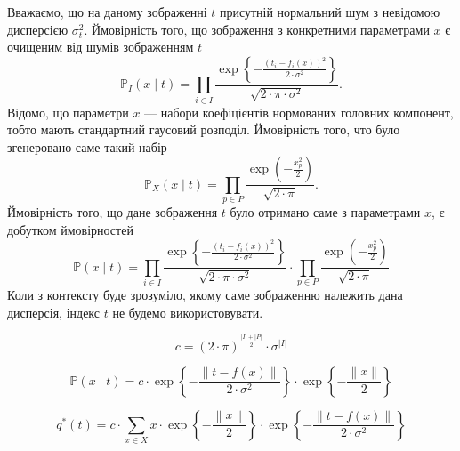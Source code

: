 Вважаємо, що на даному зображенні $t$
присутній нормальний шум з невідомою дисперсією $\sigma^2_t$.
Ймовірність того, що зображення з конкретними параметрами $x$
є очищеним від шумів зображенням $t$
\begin{equation*}
  \mathbb{P}_I\left( x \mid t \right)
  = \prod_{i \in I}
    \frac{\exp{\left\{ - \frac{\left( t_i - f_i\left( x \right) \right)^2}
    {2 \cdot \sigma^2} \right\}}}{\sqrt{2 \cdot \pi \cdot \sigma^2}}.
\end{equation*}
Відомо, що параметри $x$ --- набори коефіцієнтів нормованих головних компонент,
тобто мають стандартний гаусовий розподіл.
Ймовірність того, что було згенеровано саме такий набір
\begin{equation*}
  \mathbb{P}_X\left( x \mid t \right)
  = \prod_{p \in P}
    \frac{\exp{\left( - \frac{x_p^2}{2} \right)}}{\sqrt{2 \cdot \pi}}.
\end{equation*}
Ймовірність того,
що дане зображення $t$ було отримано саме з параметрами $x$,
є добутком ймовірностей
\begin{equation*}
  \mathbb{P}\left( x \mid t \right)
  = \prod_{i \in I}
    \frac{\exp{\left\{ - \frac{\left( t_i - f_i\left( x \right) \right)^2}
         {2 \cdot \sigma^2} \right\}}}{\sqrt{2 \cdot \pi \cdot \sigma^2}}
    \cdot
    \prod_{p \in P}
    \frac{\exp{\left( - \frac{x_p^2}{2} \right)}}{\sqrt{2 \cdot \pi}}
\end{equation*}
Коли з контексту буде зрозуміло,
якому саме зображенню належить дана дисперсія,
індекс $t$ не будемо використовувати.

\begin{equation*}
  c = \left( 2 \cdot \pi \right)^{\frac{\left| I \right| + \left| P \right|}{2}}
      \cdot \sigma^{\left| I \right|}
\end{equation*}

\begin{equation*}
  \mathbb{P}\left( x \mid t \right)
  = c
    \cdot \exp{\left\{ - \frac{\left\| t - f\left( x \right) \right\|}
                              {2 \cdot \sigma^2} \right\}}
    \cdot \exp{\left\{ - \frac{\left\| x \right\|}{2} \right\}}
\end{equation*}

\begin{equation*}
  q^* \left( t \right)
  = c
    \cdot \sum_{x \in X}
      x
      \cdot \exp{\left\{ - \frac{\left\| x \right\|}{2} \right\}}
      \cdot \exp{\left\{ - \frac{\left\| t - f\left( x \right) \right\|}
                                {2 \cdot \sigma^2} \right\}}
\end{equation*}

